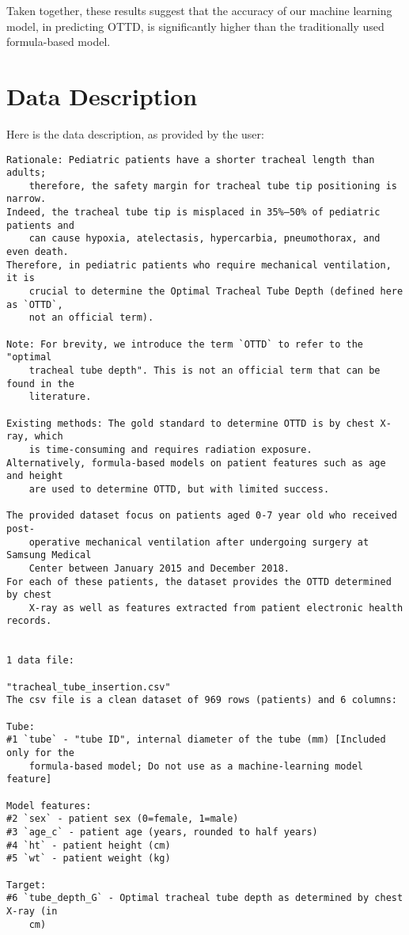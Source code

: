 \documentclass[11pt]{article}
\begin{document}
Taken together, these results suggest that the accuracy of our machine learning model, in predicting OTTD, is significantly higher than the traditionally used formula-based model.


\clearpage
\appendix

\section{Data Description} \label{sec:data_description} Here is the data description, as provided by the user:

\begin{Verbatim}[tabsize=4]
Rationale: Pediatric patients have a shorter tracheal length than adults;
	therefore, the safety margin for tracheal tube tip positioning is narrow.
Indeed, the tracheal tube tip is misplaced in 35%–50% of pediatric patients and
	can cause hypoxia, atelectasis, hypercarbia, pneumothorax, and even death.
Therefore, in pediatric patients who require mechanical ventilation, it is
	crucial to determine the Optimal Tracheal Tube Depth (defined here as `OTTD`,
	not an official term).

Note: For brevity, we introduce the term `OTTD` to refer to the "optimal
	tracheal tube depth". This is not an official term that can be found in the
	literature.

Existing methods: The gold standard to determine OTTD is by chest X-ray, which
	is time-consuming and requires radiation exposure.
Alternatively, formula-based models on patient features such as age and height
	are used to determine OTTD, but with limited success.

The provided dataset focus on patients aged 0-7 year old who received post-
	operative mechanical ventilation after undergoing surgery at Samsung Medical
	Center between January 2015 and December 2018.
For each of these patients, the dataset provides the OTTD determined by chest
	X-ray as well as features extracted from patient electronic health records.


1 data file:

"tracheal_tube_insertion.csv"
The csv file is a clean dataset of 969 rows (patients) and 6 columns:

Tube:
#1 `tube` - "tube ID", internal diameter of the tube (mm) [Included only for the
	formula-based model; Do not use as a machine-learning model feature]

Model features:
#2 `sex` - patient sex (0=female, 1=male)
#3 `age_c` - patient age (years, rounded to half years)
#4 `ht` - patient height (cm)
#5 `wt` - patient weight (kg)

Target:
#6 `tube_depth_G` - Optimal tracheal tube depth as determined by chest X-ray (in
	cm)



\end{Verbatim}
\end{document}
